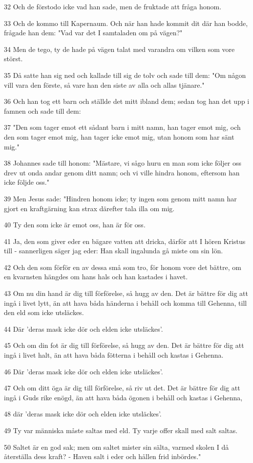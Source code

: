 \par 32 Och de förstodo icke vad han sade, men de fruktade att fråga honom.
\par 33 Och de kommo till Kapernaum. Och när han hade kommit dit där han bodde, frågade han dem: "Vad var det I samtaladen om på vägen?"
\par 34 Men de tego, ty de hade på vägen talat med varandra om vilken som vore störst.
\par 35 Då satte han sig ned och kallade till sig de tolv och sade till dem: "Om någon vill vara den förste, så vare han den siste av alla och allas tjänare."
\par 36 Och han tog ett barn och ställde det mitt ibland dem; sedan tog han det upp i famnen och sade till dem:
\par 37 "Den som tager emot ett sådant barn i mitt namn, han tager emot mig, och den som tager emot mig, han tager icke emot mig, utan honom som har sänt mig."
\par 38 Johannes sade till honom: "Mästare, vi sågo huru en man som icke följer oss drev ut onda andar genom ditt namn; och vi ville hindra honom, eftersom han icke följde oss."
\par 39 Men Jesus sade: "Hindren honom icke; ty ingen som genom mitt namn har gjort en kraftgärning kan strax därefter tala illa om mig.
\par 40 Ty den som icke är emot oss, han är för oss.
\par 41 Ja, den som giver eder en bägare vatten att dricka, därför att I hören Kristus till - sannerligen säger jag eder: Han skall ingalunda gå miste om sin lön.
\par 42 Och den som förför en av dessa små som tro, för honom vore det bättre, om en kvarnsten hängdes om hans hals och han kastades i havet.
\par 43 Om nu din hand är dig till förförelse, så hugg av den. Det är bättre för dig att ingå i livet lytt, än att hava båda händerna i behåll och komma till Gehenna, till den eld som icke utsläckes.
\par 44 Där 'deras mask icke dör och elden icke utsläckes'.
\par 45 Och om din fot är dig till förförelse, så hugg av den. Det är bättre för dig att ingå i livet halt, än att hava båda fötterna i behåll och kastas i Gehenna.
\par 46 Där 'deras mask icke dör och elden icke utsläckes'.
\par 47 Och om ditt öga är dig till förförelse, så riv ut det. Det är bättre för dig att ingå i Guds rike enögd, än att hava båda ögonen i behåll och kastas i Gehenna,
\par 48 där 'deras mask icke dör och elden icke utsläckes'.
\par 49 Ty var människa måste saltas med eld. Ty varje offer skall med salt saltas.
\par 50 Saltet är en god sak; men om saltet mister sin sälta, varmed skolen I då återställa dess kraft? - Haven salt i eder och hållen frid inbördes."

